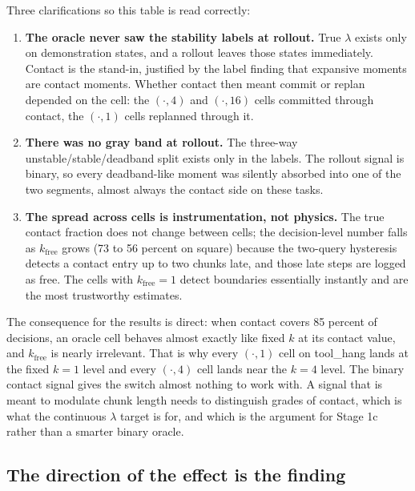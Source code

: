 \documentclass[11pt]{article}
\begin{document}
Three clarifications so this table is read correctly:

\begin{enumerate}[leftmargin=1.6em]
\item \textbf{The oracle never saw the stability labels at rollout.} True
$\lambda$ exists only on demonstration states, and a rollout leaves those states
immediately. Contact is the stand-in, justified by the label finding that
expansive moments are contact moments. Whether contact then meant commit or replan
depended on the cell: the $(\cdot,4)$ and $(\cdot,16)$ cells committed through
contact, the $(\cdot,1)$ cells replanned through it.
\item \textbf{There was no gray band at rollout.} The three-way
unstable/stable/deadband split exists only in the labels. The rollout signal is
binary, so every deadband-like moment was silently absorbed into one of the two
segments, almost always the contact side on these tasks.
\item \textbf{The spread across cells is instrumentation, not physics.} The true
contact fraction does not change between cells; the decision-level number falls as
$k_{\mathrm{free}}$ grows (73 to 56 percent on square) because the two-query
hysteresis detects a contact entry up to two chunks late, and those late steps are
logged as free. The cells with $k_{\mathrm{free}}{=}1$ detect boundaries
essentially instantly and are the most trustworthy estimates.
\end{enumerate}

The consequence for the results is direct: when contact covers 85 percent of
decisions, an oracle cell behaves almost exactly like fixed $k$ at its contact
value, and $k_{\mathrm{free}}$ is nearly irrelevant. That is why every $(\cdot,1)$
cell on tool\_hang lands at the fixed $k{=}1$ level and every $(\cdot,4)$ cell
lands near the $k{=}4$ level. The binary contact signal gives the switch almost
nothing to work with. A signal that is meant to modulate chunk length needs to
distinguish grades of contact, which is what the continuous $\lambda$ target is
for, and which is the argument for Stage 1c rather than a smarter binary oracle.

\subsection{The direction of the effect is the finding}
\end{document}
